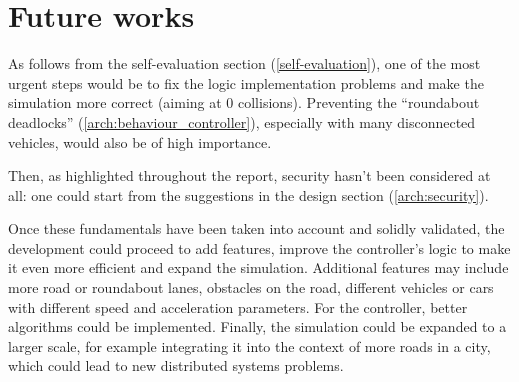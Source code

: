 \section{Future works}\label{future-works}

As follows from the self-evaluation section (\ref{self-evaluation}), one of the
most urgent steps would be to fix the logic implementation problems and make the
simulation more correct (aiming at 0 collisions). Preventing the ``roundabout
deadlocks'' (\ref{arch:behaviour_controller}), especially with many disconnected
vehicles, would also be of high importance.

Then, as highlighted throughout the report, security hasn't been considered at
all: one could start from the suggestions in the design section
(\ref{arch:security}).

Once these fundamentals have been taken into account and solidly validated, the
development could proceed to add features, improve the controller's logic to
make it even more efficient and expand the simulation. Additional features may
include more road or roundabout lanes, obstacles on the road, different vehicles
or cars with different speed and acceleration parameters. For the controller,
better algorithms could be implemented. Finally, the simulation could be
expanded to a larger scale, for example integrating it into the context of more
roads in a city, which could lead to new distributed systems problems.
